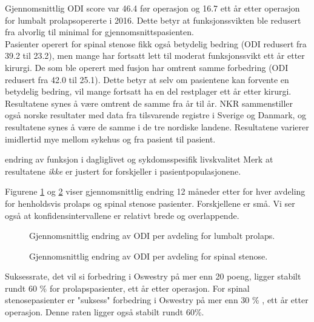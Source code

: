 \documentclass [norsk,a4paper,twoside]{article}\usepackage[]{graphicx}\usepackage[]{color}
\begin{document}
Gjennomsnittlig ODI score var 46.4 før operasjon og 16.7 ett år etter
operasjon for lumbalt prolapsopererte i 2016. Dette betyr at funksjonssvikten ble redusert 
fra alvorlig til minimal for gjennomsnittspasienten. \\

Pasienter operert for spinal stenose fikk også
betydelig bedring (ODI redusert fra 39.2 til 23.2), men mange har 
fortsatt lett til moderat funksjonssvikt ett år etter kirurgi. 
De som ble operert med fusjon har
omtrent samme forbedring (ODI redusert fra 42.0 til 25.1). 
Dette betyr at selv om
pasientene kan forvente en betydelig bedring, vil mange fortsatt ha en del restplager
ett år etter kirurgi. 
Resultatene synes å være omtrent de samme fra år til år. NKR
sammenstiller også norske resultater med data fra tilsvarende registre i Sverige og
Danmark, og resultatene synes å være de samme i de tre nordiske landene.
Resultatene varierer imidlertid mye mellom sykehus og fra pasient til pasient.


endring av funksjon i dagliglivet og sykdomsspesifik livskvalitet
Merk at resultatene \textit{ikke} er justert for forskjeller i pasientpopulasjonene. 



      
      Figurene \ref{fig:OswEndrAvdPro} og \ref{fig:OswEndrAvdSS} viser gjennomsnittlig endring 12 måneder etter for hver avdeling for henholdsvis prolaps og spinal stenose pasienter. Forskjellene er små. Vi ser også at konfidensintervallene er relativt brede og overlappende.

\begin{figure}[h] 
\caption{Gjennomsnittlig endring av ODI per avdeling for lumbalt prolaps.}
\label{fig:OswEndrAvdPro}
\end{figure}

\begin{figure}[h] 
\caption{Gjennomsnittlig endring av ODI per avdeling for spinal stenose.}
\label{fig:OswEndrAvdSS}
\end{figure}




Suksessrate, det vil si forbedring i Oswestry på mer enn 20 poeng, ligger stabilt rundt 60 \% for prolapspasienter, ett år etter operasjon. 
For spinal stenosepasienter er "suksess" forbedring i Oswestry på mer enn 30 \% , ett år etter operasjon. Denne raten ligger også stabilt rundt 60\%.
\end{document}

